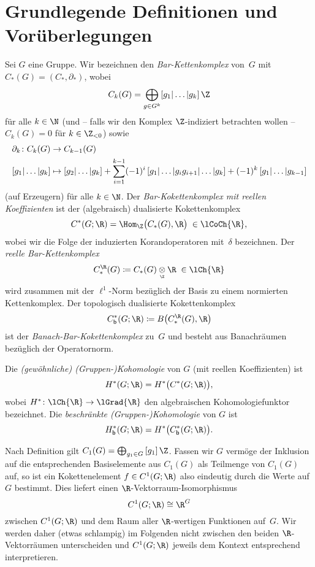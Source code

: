 \section{Grundlegende Definitionen und Vorüberlegungen}
\label{ch3:basics}%
%
Sei $G$ eine Gruppe. Wir bezeichnen den \emph{Bar-Kettenkomplex} von~$G$
mit $C_\ast(G) = (C_\ast,\partial_\ast)$, wobei
\[ C_k(G) = \bigoplus_{g\in G^k} [g_1|\ldots|g_k]\,\Z \]
für alle $k\in\N$ (und -- falls wir den Komplex $\Z$-indiziert betrachten wollen
-- $C_k(G) = 0$ für $k\in\Z_{<0}$) sowie
\begin{align*}
    \partial_k\colon C_k(G) &\to C_{k-1}(G)
    \\
    [g_1|\ldots|g_k] &\mapsto [g_2|\ldots|g_k]
    + \sum_{i=1}^{k-1} (-1)^i \, [g_1|\ldots|g_ig_{i+1}|\ldots|g_k]
    + (-1)^k \, [g_1|\ldots|g_{k-1}]
\end{align*}
(auf Erzeugern) für alle $k\in\N$. Der \emph{Bar-Kokettenkomplex mit reellen
Koeffizienten} ist der (algebraisch) dualisierte Kokettenkomplex
\[ C^\ast(G;\R) = \Hom_\Z\bigl( C_\ast(G), \R \bigr)  \;\in\lCoCh{\R} , \]
wobei wir die Folge der induzierten Korandoperatoren mit~$\delta$ bezeichnen.
Der \emph{reelle Bar-Kettenkomplex}
\[ C_\ast^{\R}(G)
    \defeq C_\ast(G) \underset{\scriptscriptstyle\Z}\otimes \R
    \;\in\lCh{\R}
\]
wird zusammen mit der $\ell^1$-Norm bezüglich der Basis zu einem
normierten Kettenkomplex. Der topologisch dualisierte Kokettenkomplex
\[ \Cb^\ast(G;\R) \defeq B\bigl( C_\ast^{\R}(G), \R \bigr) \]
ist der \emph{Banach-Bar-Kokettenkomplex} zu~$G$ und
besteht aus Banachräumen bezüglich der Operatornorm.

Die \emph{(gewöhnliche) (Gruppen-)Kohomologie} von $G$ (mit reellen
Koeffizienten) ist
\[ H^\ast(G;\R) = H^\ast\bigl( C^\ast(G;\R) \bigr)  , \]
wobei $H^\ast\colon\lCh{\R}\to\lGrad{\R}$ den algebraischen Kohomologiefunktor
bezeichnet. Die \emph{beschränkte (Gruppen-)Kohomologie} von $G$ ist
\[ \Hb^\ast(G;\R) = H^\ast\bigl( \Cb^\ast(G;\R) \bigr)  . \]

Nach Definition gilt $C_1(G) = \bigoplus_{g_1\in G}\, [g_1]\,\Z$. Fassen wir
$G$ vermöge der Inklusion auf die entsprechenden Basiselemente aus $C_1(G)$
als Teilmenge von $C_1(G)$ auf, so ist ein Kokettenelement $f\in C^1(G;\R)$ also 
eindeutig durch die Werte auf $G$ bestimmt. Dies liefert einen
$\R$-Vektorraum-Isomorphismus 
\[ C^1(G;\R) \cong \R^G  \]
zwischen $C^1(G;\R)$ und dem Raum aller $\R$-wertigen Funktionen auf~$G$.
Wir werden daher (etwas schlampig) im Folgenden nicht zwischen den beiden
$\R$-Vektorräumen unterscheiden und $C^1(G;\R)$ jeweils dem Kontext entsprechend
interpretieren.

